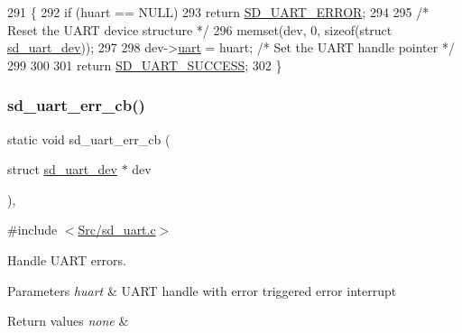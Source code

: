 \begin{DoxyCode}
291 \{
292     \textcolor{keywordflow}{if} (huart == NULL)
293         \textcolor{keywordflow}{return} \mbox{\hyperlink{group___s_d___u_a_r_t___types_ggaff649a266fb34035c10733370c4fd104ad77d98472c0c3bb192d745b3389de08d}{SD\_UART\_ERROR}};
294     
295     \textcolor{comment}{/* Reset the UART device structure */}
296     memset(dev, 0, \textcolor{keyword}{sizeof}(\textcolor{keyword}{struct} \mbox{\hyperlink{structsd__uart__dev}{sd\_uart\_dev}}));
297   
298     dev->\mbox{\hyperlink{structsd__uart__dev_a31b2a452cffe839ac4a3bf86eddc16b0}{uart}} = huart;      \textcolor{comment}{/* Set the UART handle pointer */}
299     
300     
301     \textcolor{keywordflow}{return} \mbox{\hyperlink{group___s_d___u_a_r_t___types_ggaff649a266fb34035c10733370c4fd104a3b6fe085405a5d58c55226fd59f01994}{SD\_UART\_SUCCESS}};
302 \}
\end{DoxyCode}
\mbox{\label{group___s_d___u_a_r_t_gafc595787c83c748d767ac49596be144e}} 
\subsubsection{\texorpdfstring{sd\+\_\+uart\+\_\+err\+\_\+cb()}{sd\_uart\_err\_cb()}}
{\footnotesize\ttfamily static void sd\+\_\+uart\+\_\+err\+\_\+cb (\begin{DoxyParamCaption}\item[{struct \mbox{\hyperlink{structsd__uart__dev}{sd\+\_\+uart\+\_\+dev}} $\ast$}]{dev }\end{DoxyParamCaption})\hspace{0.3cm}{\ttfamily [inline]}, {\ttfamily [static]}}



{\ttfamily \#include $<$\mbox{\hyperlink{sd__uart_8c}{Src/sd\+\_\+uart.\+c}}$>$}



Handle U\+A\+RT errors. 


\begin{DoxyParams}{Parameters}
{\em huart} & U\+A\+RT handle with error triggered error interrupt \\
\hline
\end{DoxyParams}

\begin{DoxyRetVals}{Return values}
{\em none} & \\
\hline
\end{DoxyRetVals}

